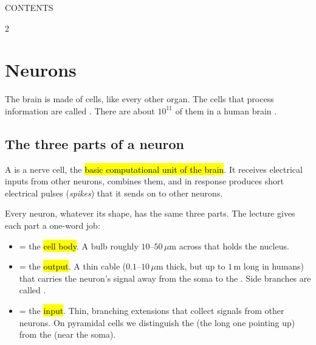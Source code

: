 {\ttfamily\small\color{pgreen}CONTENTS}
\begin{multicols}{2}\footnotesize\setlength{\parskip}{0pt}
\setcounter{tocdepth}{1}
\makeatletter{}\makeatother
\end{multicols}


\section{Neurons}

The brain is made of cells, like every other organ. The cells that process information are called
. There are about $10^{11}$ of them in a human brain .

\subsection{The three parts of a neuron}

\begin{defn}[Neuron]
A  is a nerve cell, the \hl{basic computational unit of the brain}. It receives electrical inputs from
other neurons, combines them, and in response produces short electrical pulses (\emph{spikes}) that it sends on
to other neurons.
\end{defn}

Every neuron, whatever its shape, has the same three parts. The lecture gives each part a one-word job:

\begin{defn}
\begin{itemize}
  \item {} = the \hl{cell body}. A bulb roughly $10$--$50\,\mu$m across that holds the nucleus.
  \item {} = the \hl{output}. A thin cable ($0.1$--$10\,\mu$m thick, but up to $1$\,m long in humans)
        that carries the neuron's signal away from the soma to the . Side branches are called .
  \item {} = the \hl{input}. Thin, branching extensions that collect signals from other neurons.
        On pyramidal cells we distinguish the  (the long one pointing up) from the  (near the soma).
\end{itemize}
\end{defn}

